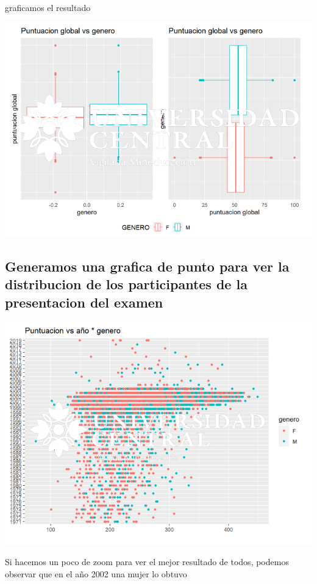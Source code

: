 \documentclass{article}
\begin{document}
graficamos el resultado

\begin{center}
\includegraphics[scale=0.5]{Captura4.PNG} 
\end{center}
\newpage

\subsection{Generamos una grafica de punto para ver la distribucion de los participantes de la presentacion del examen}

\begin{center}
\includegraphics[scale=0.6]{Captura5.PNG} 
\end{center}

Si hacemos un poco de zoom para ver el mejor resultado de todos, podemos observar que en el año 2002 una mujer lo obtuvo
\end{document}
